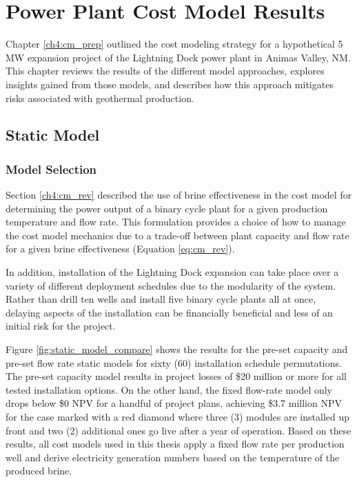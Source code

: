 \chapter{Power Plant Cost Model Results}\label{ch6:cm_results}

Chapter \ref{ch4:cm_prep} outlined the cost modeling strategy for a hypothetical 5 MW expansion project of the Lightning Dock power plant in Animas Valley, NM. This chapter reviews the results of the different model approaches, explores insights gained from those models, and describes how this approach mitigates risks associated with geothermal production.

\section{Static Model}
\label{ch6:static_mod}

\subsection{Model Selection}

Section \ref{ch4:cm_rev} described the use of brine effectiveness in the cost model for determining the power output of a binary cycle plant for a given production temperature and flow rate. This formulation provides a choice of how to manage the cost model mechanics due to a trade-off between plant capacity and flow rate for a given brine effectiveness (Equation \ref{eq:cm_rev}).

In addition, installation of the Lightning Dock expansion can take place over a variety of different deployment schedules due to the modularity of the system. Rather than drill ten wells and install five binary cycle plants all at once, delaying aspects of the installation can be financially beneficial and less of an initial risk for the project.  

Figure \ref{fig:static_model_compare} shows the results for the pre-set capacity and pre-set flow rate static models for sixty (60) installation schedule permutations. The pre-set capacity model results in project losses of \$20 million or more for all tested installation options. On the other hand, the fixed flow-rate model only drops below \$0 NPV for a handful of project plans, achieving \$3.7 million NPV for the case marked with a red diamond where three (3) modules are installed up front and two (2) additional ones go live after a year of operation. Based on these results, all cost models used in this thesis apply a fixed flow rate per production well and derive electricity generation numbers based on the temperature of the produced brine.

